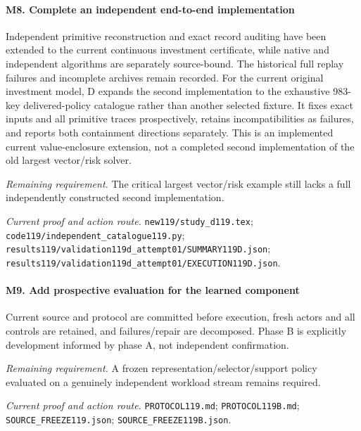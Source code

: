 \paragraph{M8. Complete an independent end-to-end implementation}

Independent primitive reconstruction and exact record auditing have been extended to the current continuous investment certificate, while native and independent algorithms are separately source-bound. The historical full replay failures and incomplete archives remain recorded. For the current original investment model, D expands the second implementation to the exhaustive 983-key delivered-policy catalogue rather than another selected fixture. It fixes exact inputs and all primitive traces prospectively, retains incompatibilities as failures, and reports both containment directions separately. This is an implemented current value-enclosure extension, not a completed second implementation of the old largest vector/\allowbreak{}risk solver.

\par\emph{Remaining requirement.} The critical largest vector/\allowbreak{}risk example still lacks a full independently constructed second implementation.

\par\emph{Current proof and action route.} \nolinkurl{new119/study_d119.tex}; \nolinkurl{code119/independent_catalogue119.py}; \nolinkurl{results119/validation119d_attempt01/SUMMARY119D.json}; \nolinkurl{results119/validation119d_attempt01/EXECUTION119D.json}.

\paragraph{M9. Add prospective evaluation for the learned component}

Current source and protocol are committed before execution, fresh actors and all controls are retained, and failures/\allowbreak{}repair are decomposed. Phase B is explicitly development informed by phase A, not independent confirmation.

\par\emph{Remaining requirement.} A frozen representation/\allowbreak{}selector/\allowbreak{}support policy evaluated on a genuinely independent workload stream remains required.

\par\emph{Current proof and action route.} \nolinkurl{PROTOCOL119.md}; \nolinkurl{PROTOCOL119B.md}; \nolinkurl{SOURCE_FREEZE119.json}; \nolinkurl{SOURCE_FREEZE119B.json}.

